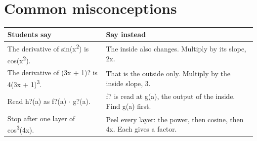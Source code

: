 \documentclass[11pt]{article}
\begin{document}
\section*{Common misconceptions}\begin{tabularx}{\textwidth}{@{}X X@{}}\toprule Students say & Say instead\\\midrule
The derivative of sin(x\textsuperscript{2}) is cos(x\textsuperscript{2}). & The inside also changes. Multiply by its slope, 2x.\\
The derivative of (3x + 1)? is 4(3x + 1)\textsuperscript{3}. & That is the outside only. Multiply by the inside slope, 3.\\
Read h?(a) as f?(a) $\cdot$ g?(a). & f? is read at g(a), the output of the inside. Find g(a) first.\\
Stop after one layer of cos\textsuperscript{3}(4x). & Peel every layer: the power, then cosine, then 4x. Each gives a factor.\\
\bottomrule\end{tabularx}
\end{document}
